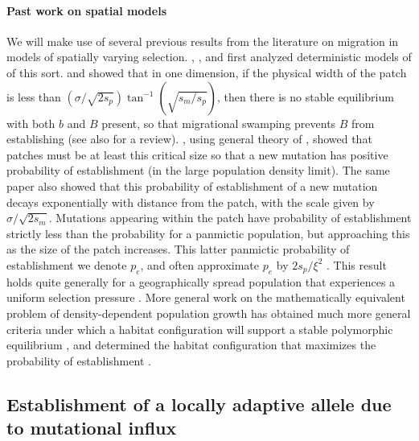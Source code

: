 \documentclass[10pt,letterpaper]{article}
\newcommand{\citep}[1]{\cite{#1}}
\newcommand{\citet}[1]{\cite{#1}}
\begin{document}
\paragraph{Past work on spatial models}
We will make use of several previous results from the literature on
migration in models of spatially varying selection.
\citet{haldane1948theory}, \citet{fisher1950frequencies}, and \citet{slatkin1973geneflow} first analyzed
deterministic models of of this sort.
\citet{nagylaki1975conditions} and \citet{conley1975application} showed that in one dimension, if the physical width of the patch is less than $(\sigma/\sqrt{2s_p}) \tan^{-1} (\sqrt{s_m/s_p})$, 
then there is no stable equilibrium with both $b$ and $B$ present,  %
so that migrational swamping prevents $B$ from establishing (see also \citet{lenormand2002limits} for a review).
\citet{barton1987establishment}, using general theory of \citet{pollak1966survival}, showed  
that patches must be at least this critical size so that a new mutation has positive probability of establishment
(in the large population density limit).
The same paper also showed that
this probability of establishment of a new mutation decays exponentially with distance from the patch, 
with the scale given by $\sigma/\sqrt{2s_m}$. 
Mutations appearing within the patch have probability of establishment
strictly less than the probability for a panmictic population,
but approaching this as the size of the patch increases.
This latter panmictic probability of establishment we denote $p_e$,
and often approximate $p_e$ by $2 s_p / \xi^2$ \citep{haldane1927mathematical,fisher1930genetical}.
This result holds quite generally for a geographically spread population that experiences a uniform selection
pressure \citep{maruyama1970fixation,cherry2003diffusion}. 
More general work on the mathematically equivalent problem of density-dependent population growth 
has obtained much more general criteria
under which a habitat configuration will support a stable polymorphic equilibrium \citep{cantrell1989diffusive},
and determined the habitat configuration that maximizes the probability of establishment \citep{lou2006minimization}.


\subsection*{Establishment of a locally adaptive allele due to mutational influx}
\label{ss:patchymutation}
\end{document}
